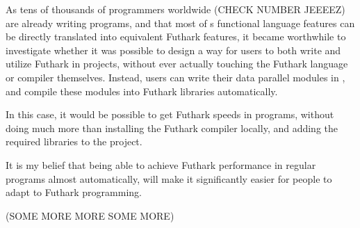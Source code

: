 As tens of thousands of programmers worldwide (CHECK NUMBER JEEEEZ) are already
writing \fsharp{} programs, and that most of \fsharp{}s functional language features can be
directly translated into equivalent Futhark features, it became worthwhile to
investigate whether it was possible to design a way for users to both write and
utilize Futhark in \fsharp{} projects, without ever actually touching the
Futhark language or compiler themselves.
Instead, users can write their data parallel \fsharp{} modules in \fshark{}, and compile these
modules into Futhark libraries automatically.

In this case, it would be possible to get Futhark speeds in \fsharp{} programs,
without doing much more than installing the Futhark compiler locally, and adding
the required \fshark{} libraries to the \fsharp{} project.

It is my belief that being able to achieve Futhark performance in regular \fsharp{}
programs almost automatically, will make it significantly easier for people to
adapt to Futhark programming.

(SOME MORE MORE SOME MORE)

